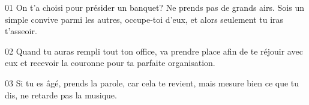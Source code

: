 01 On t’a choisi pour présider un banquet? Ne prends pas de grands airs. Sois un simple convive parmi les autres, occupe-toi d’eux, et alors seulement tu iras t’asseoir.

02 Quand tu auras rempli tout ton office, va prendre place afin de te réjouir avec eux et recevoir la couronne pour ta parfaite organisation.

03 Si tu es âgé, prends la parole, car cela te revient, mais mesure bien ce que tu dis, ne retarde pas la musique.
